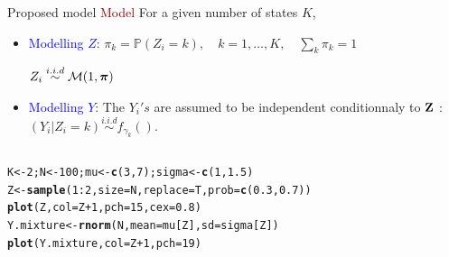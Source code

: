 \documentclass{beamer}\usepackage[]{graphicx}\usepackage[]{color}
\makeatletter
\newcommand{\hlnum}[1]{\textcolor[rgb]{0.686,0.059,0.569}{#1}}%
\newcommand{\hlopt}[1]{\textcolor[rgb]{0,0,0}{#1}}%
\newcommand{\hlstd}[1]{\textcolor[rgb]{0.345,0.345,0.345}{#1}}%
\newcommand{\hlkwb}[1]{\textcolor[rgb]{0.69,0.353,0.396}{#1}}%
\newcommand{\hlkwc}[1]{\textcolor[rgb]{0.333,0.667,0.333}{#1}}%
\newcommand{\hlkwd}[1]{\textcolor[rgb]{0.737,0.353,0.396}{\textbf{#1}}}%
\newenvironment{kframe}{%
 \def\at@end@of@kframe{}%
 \ifinner\ifhmode%
  \def\at@end@of@kframe{\end{minipage}}%
  \begin{minipage}{\columnwidth}%
 \fi\fi%
 \def\FrameCommand##1{\hskip\@totalleftmargin \hskip-\fboxsep
 \colorbox{shadecolor}{##1}\hskip-\fboxsep
     \hskip-\linewidth \hskip-\@totalleftmargin \hskip\columnwidth}%
 \MakeFramed {\advance\hsize-\width
   \@totalleftmargin\z@ \linewidth\hsize
   \@setminipage}}%
 {\par\unskip\endMakeFramed%
 \at@end@of@kframe}
\newenvironment{knitrout}{}{} %
\newcommand{\blue}[1]{\textcolor{blue}{#1}}
\newcommand{\emphase}[1]{\textcolor{darkred}{#1}}
\newcommand{\paragraph}[1]{\emphase{#1}}
\renewcommand{\P}{\mathbb{P}}
\newcommand{\Mcal}{\mathcal{M}}
\newcommand{\Zbf}{{\bf Z}}
\newcommand{\pibf}{\mbox{\mathversion{bold}{$\pi$}}}
\makeatother
\begin{document}
\begin{frame}[fragile]{Proposed model}
\paragraph{Model}
For a given number of states $K$, 
\begin{itemize}
\item
 \blue{Modelling $Z$}: $\pi_k=\P(Z_i=k), \quad k=1,\ldots, K, \quad \sum_k \pi_k=1$\par
 $Z_i \overset{i.i.d}{\sim} \Mcal(1, \pibf)$
 \item \blue{Modelling $Y$}: The $Y_i's$ are assumed to be independent  conditionnaly to $\Zbf$ : $(Y_i\vert Z_i = k) \overset{i.i.d}{\sim} f_{\gamma_k}().$
\end{itemize}
\begin{columns}
  \begin{column}{0.45\textwidth}
\begin{knitrout}\tiny
{}\color{fgcolor}\begin{kframe}
\begin{alltt}
\hlstd{K} \hlkwb{<-} \hlnum{2}\hlstd{; N} \hlkwb{<-} \hlnum{100}\hlstd{; mu} \hlkwb{<-} \hlkwd{c}\hlstd{(}\hlnum{3}\hlstd{,} \hlnum{7}\hlstd{); sigma} \hlkwb{<-} \hlkwd{c}\hlstd{(}\hlnum{1}\hlstd{,}\hlnum{1.5}\hlstd{)}
\hlstd{Z} \hlkwb{<-} \hlkwd{sample}\hlstd{(}\hlnum{1}\hlopt{:}\hlnum{2}\hlstd{,} \hlkwc{size} \hlstd{= N,} \hlkwc{replace}\hlstd{=T,} \hlkwc{prob}\hlstd{=}\hlkwd{c}\hlstd{(}\hlnum{0.3}\hlstd{,} \hlnum{0.7}\hlstd{))}
\hlkwd{plot}\hlstd{(Z,} \hlkwc{col}\hlstd{=Z}\hlopt{+}\hlnum{1}\hlstd{,} \hlkwc{pch}\hlstd{=}\hlnum{15}\hlstd{,} \hlkwc{cex}\hlstd{=}\hlnum{0.8}\hlstd{)}
\hlstd{Y.mixture} \hlkwb{<-} \hlkwd{rnorm}\hlstd{(N,} \hlkwc{mean}\hlstd{=mu[Z],} \hlkwc{sd}\hlstd{=sigma[Z])}
\hlkwd{plot}\hlstd{(Y.mixture,} \hlkwc{col}\hlstd{=Z}\hlopt{+}\hlnum{1}\hlstd{,} \hlkwc{pch}\hlstd{=}\hlnum{19}\hlstd{)}
\end{alltt}
\end{kframe}
\end{knitrout}
 \end{column}
  \begin{column}{0.45\textwidth}

\end{column}
\end{columns}
\end{frame}
\end{document}
